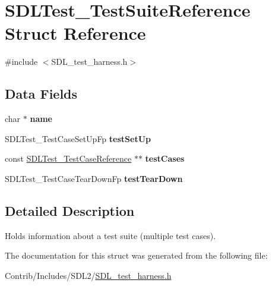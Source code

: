 \hypertarget{struct_s_d_l_test___test_suite_reference}{}\section{S\+D\+L\+Test\+\_\+\+Test\+Suite\+Reference Struct Reference}
\label{struct_s_d_l_test___test_suite_reference}


{\ttfamily \#include $<$S\+D\+L\+\_\+test\+\_\+harness.\+h$>$}

\subsection*{Data Fields}
\begin{DoxyCompactItemize}
\item 
char $\ast$ {\bfseries name}\hypertarget{struct_s_d_l_test___test_suite_reference_a5ac083a645d964373f022d03df4849c8}{}\label{struct_s_d_l_test___test_suite_reference_a5ac083a645d964373f022d03df4849c8}

\item 
S\+D\+L\+Test\+\_\+\+Test\+Case\+Set\+Up\+Fp {\bfseries test\+Set\+Up}\hypertarget{struct_s_d_l_test___test_suite_reference_ab627d8169b6ded0e41636a09f2108282}{}\label{struct_s_d_l_test___test_suite_reference_ab627d8169b6ded0e41636a09f2108282}

\item 
const \hyperlink{struct_s_d_l_test___test_case_reference}{S\+D\+L\+Test\+\_\+\+Test\+Case\+Reference} $\ast$$\ast$ {\bfseries test\+Cases}\hypertarget{struct_s_d_l_test___test_suite_reference_ac95fa35cd917c457107a82bf8a3f374f}{}\label{struct_s_d_l_test___test_suite_reference_ac95fa35cd917c457107a82bf8a3f374f}

\item 
S\+D\+L\+Test\+\_\+\+Test\+Case\+Tear\+Down\+Fp {\bfseries test\+Tear\+Down}\hypertarget{struct_s_d_l_test___test_suite_reference_a14b9261f301a687508830decf5639d5a}{}\label{struct_s_d_l_test___test_suite_reference_a14b9261f301a687508830decf5639d5a}

\end{DoxyCompactItemize}


\subsection{Detailed Description}
Holds information about a test suite (multiple test cases). 

The documentation for this struct was generated from the following file\+:\begin{DoxyCompactItemize}
\item 
Contrib/\+Includes/\+S\+D\+L2/\hyperlink{_s_d_l__test__harness_8h}{S\+D\+L\+\_\+test\+\_\+harness.\+h}\end{DoxyCompactItemize}
